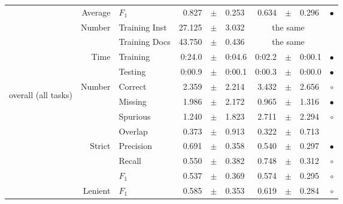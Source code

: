 \begin{longtable}{|r|r|l||rcl|rcl|c|}
\cline{2-10} &                     Average &           $F_1$ &       0.827 &  $\pm$  &       0.253 &       0.634 &  $\pm$  &       0.296 & $\bullet$ \\
\cline{2-10} & \multirow{2}{*}{    Number} &   Training Inst &      27.125 &  $\pm$  &       3.032 &    \multicolumn{3}{c|}{the same}         &  \\
\cline{3-10} &                             &   Training Docs &      43.750 &  $\pm$  &       0.436 &    \multicolumn{3}{c|}{the same}         &  \\
\cline{2-10} & \multirow{2}{*}{      Time} &        Training &      0:24.0 &  $\pm$  &      0:04.6 &      0:02.2 &  $\pm$  &      0:00.1 & $\bullet$ \\
\cline{3-10} &                             &         Testing &      0:00.9 &  $\pm$  &      0:00.1 &      0:00.3 &  $\pm$  &      0:00.0 & $\bullet$ \\
\hline
\hline
\multirow{11}{*}{\begin{sideways}overall (all tasks)\end{sideways} }
             & \multirow{4}{*}{    Number} &         Correct &       2.359 &  $\pm$  &       2.214 &       3.432 &  $\pm$  &       2.656 & $\circ$ \\
\cline{3-10} &                             &         Missing &       1.986 &  $\pm$  &       2.172 &       0.965 &  $\pm$  &       1.316 & $\bullet$ \\
\cline{3-10} &                             &        Spurious &       1.240 &  $\pm$  &       1.823 &       2.711 &  $\pm$  &       2.294 & $\circ$ \\
\cline{3-10} &                             &         Overlap &       0.373 &  $\pm$  &       0.913 &       0.322 &  $\pm$  &       0.713 &  \\
\cline{2-10} & \multirow{3}{*}{    Strict} &       Precision &       0.691 &  $\pm$  &       0.358 &       0.540 &  $\pm$  &       0.297 & $\bullet$ \\
\cline{3-10} &                             &          Recall &       0.550 &  $\pm$  &       0.382 &       0.748 &  $\pm$  &       0.312 & $\circ$ \\
\cline{3-10} &                             &           $F_1$ &       0.537 &  $\pm$  &       0.369 &       0.574 &  $\pm$  &       0.295 & $\circ$ \\
\cline{2-10} &                     Lenient &           $F_1$ &       0.585 &  $\pm$  &       0.353 &       0.619 &  $\pm$  &       0.284 & $\circ$ \\

\end{longtable}

